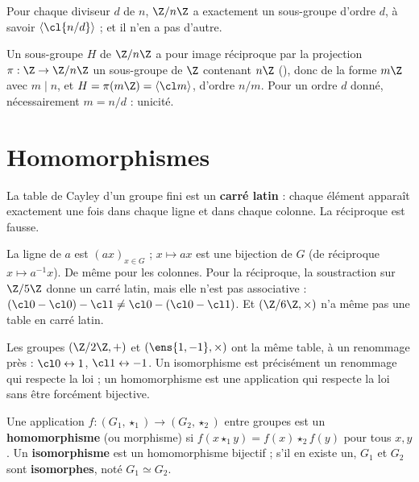 \begin{proposition}\label{prop-sg-Zn}
Pour chaque diviseur $d$ de $n$, $\Z/n\Z$ a exactement un sous-groupe d'ordre $d$, à savoir $\langle\cl{n/d}\rangle$ ; et il n'en a pas d'autre.
\end{proposition}
\begin{preuve}
Un sous-groupe $H$ de $\Z/n\Z$ a pour image réciproque par la projection $\pi:\Z\to\Z/n\Z$ un sous-groupe de $\Z$ contenant $n\Z$ (), donc de la forme $m\Z$ avec $m\mid n$, et $H=\pi(m\Z)=\langle\cl m\rangle$, d'ordre $n/m$. Pour un ordre $d$ donné, nécessairement $m=n/d$ : unicité.
\end{preuve}

\section{Homomorphismes}
\begin{proposition}\label{prop-carre-latin}
La table de Cayley d'un groupe fini est un \textbf{carré latin} : chaque élément apparaît exactement une fois dans chaque ligne et dans chaque colonne. La réciproque est fausse.
\end{proposition}
\begin{preuve}
La ligne de $a$ est $(ax)_{x\in G}$ ; $x\mapsto ax$ est une bijection de $G$ (de réciproque $x\mapsto a^{-1}x$). De même pour les colonnes. Pour la réciproque, la soustraction sur $\Z/5\Z$ donne un carré latin, mais elle n'est pas associative : $(\cl0-\cl0)-\cl1\neq\cl0-(\cl0-\cl1)$. Et $(\Z/6\Z,\times)$ n'a même pas une table en carré latin.
\end{preuve}
\begin{intuition}
Les groupes $(\Z/2\Z,+)$ et $(\ens{1,-1},\times)$ ont \og la même \fg{} table, à un renommage près : $\cl0\leftrightarrow1$, $\cl1\leftrightarrow-1$. Un isomorphisme est précisément un renommage qui respecte la loi ; un homomorphisme est une application qui respecte la loi sans être forcément bijective.
\end{intuition}
\begin{definition}
Une application $f:(G_1,\star_1)\to(G_2,\star_2)$ entre groupes est un \textbf{homomorphisme} (ou morphisme) si $f(x\star_1y)=f(x)\star_2f(y)$ pour tous $x,y$. Un \textbf{isomorphisme} est un homomorphisme bijectif ; s'il en existe un, $G_1$ et $G_2$ sont \textbf{isomorphes}, noté $G_1\simeq G_2$.
\end{definition}
